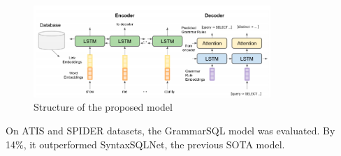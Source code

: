\begin{figure}[htb]
    \centering
    \includegraphics[width=0.8\textwidth]{pics/GrammarSQL.png}
    \caption{Structure of the proposed model}
    \label{fig:GrammarSQL}
\end{figure}


On ATIS and SPIDER datasets, the GrammarSQL model was evaluated. By 14\%, it outperformed SyntaxSQLNet, the previous SOTA model.